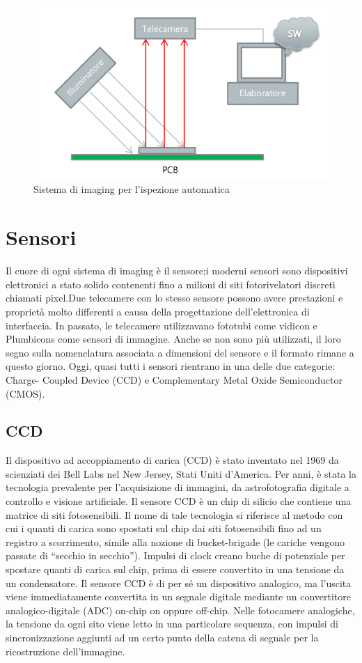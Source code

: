 
\begin{figure}[!ht]
\centering

\includegraphics[width=.6\textwidth]{img/imaging.png}

\caption{Sistema di imaging per l'ispezione automatica}
\label{fig:ccd-blockdiagram}
\end{figure}

\section{Sensori}

Il cuore di ogni sistema di imaging è il sensore;i moderni sensori sono
dispositivi elettronici a stato solido contenenti fino a milioni di siti
fotorivelatori discreti chiamati pixel.Due telecamere con lo stesso sensore
possono avere prestazioni e proprietà molto differenti a causa della
progettazione dell'elettronica di interfaccia. In passato, le telecamere
utilizzavano fototubi come vidicon e Plumbicons come sensori di immagine.
Anche se non sono più utilizzati, il loro segno sulla nomenclatura associata a
dimensioni del sensore e il formato rimane a questo giorno. Oggi, quasi tutti
i sensori rientrano in una delle due categorie: Charge- Coupled Device (CCD) e
Complementary Metal Oxide Semiconductor (CMOS).

\subsection{CCD} 
Il dispositivo ad accoppiamento di carica (CCD) è stato
inventato nel 1969 da scienziati dei Bell Labs nel New Jersey, Stati Uniti
d'America. Per anni, è stata la tecnologia prevalente per l'acquisizione di
immagini, da astrofotografia digitale a controllo e visione artificiale. Il
sensore CCD è un chip di silicio che contiene una matrice di siti
fotosensibili. Il nome di tale tecnologia si riferisce al metodo con cui i
quanti di carica sono spostati sul chip dai siti fotosensibili fino ad un
registro a scorrimento, simile alla nozione di bucket-brigade (le cariche
vengono passate di ``secchio in secchio''). Impulsi di clock creano buche di
potenziale per spostare quanti di carica sul chip, prima di essere convertito
in una tensione da un condensatore. Il sensore CCD è di per sé un dispositivo
analogico, ma l'uscita viene immediatamente convertita in un segnale digitale
mediante un convertitore analogico-digitale (ADC) on-chip on oppure off-chip.
Nelle fotocamere analogiche, la tensione da ogni sito viene letto in una
particolare sequenza, con impulsi di sincronizzazione aggiunti ad un certo
punto della catena di segnale per la ricostruzione dell'immagine.

